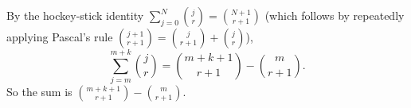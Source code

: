 By the hockey-stick identity $\sum_{j=0}^{N}\binom jr=\binom{N+1}{r+1}$ (which follows by repeatedly applying Pascal's rule $\binom{j+1}{r+1}=\binom j{r+1}+\binom jr$),
\[\sum_{j=m}^{m+k}\binom jr=\binom{m+k+1}{r+1}-\binom m{r+1}.\]
So the sum is $\boxed{\binom{m+k+1}{r+1}-\binom{m}{r+1}}$.
